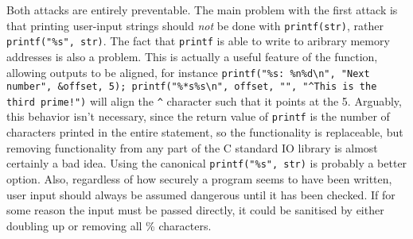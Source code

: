 Both attacks are entirely preventable. The main problem with the first attack is that printing user-input strings should \emph{not} be done with {\tt printf(str)}, rather {\tt printf("\%s", str)}. The fact that {\tt printf} is able to write to aribrary memory addresses is also a problem. This is actually a useful feature of the function, allowing outputs to be aligned, for instance {\tt printf("\%s: \%n\%d\textbackslash n", "Next number", \&offset, 5); printf("\%*s\%s\textbackslash n", offset, "", "\textasciicircum This is the third prime!")} will align the {\tt \textasciicircum} character such that it points at the 5. Arguably, this behavior isn't necessary, since the return value of {\tt printf} is the number of characters printed in the entire statement, so the functionality is replaceable, but removing functionality from any part of the C standard IO library is almost certainly a bad idea. Using the canonical {\tt printf("\%s", str)} is probably a better option. Also, regardless of how securely a program seems to have been written, user input should always be assumed dangerous until it has been checked. If for some reason the input must be passed directly, it could be sanitised by either doubling up or removing all \% characters.